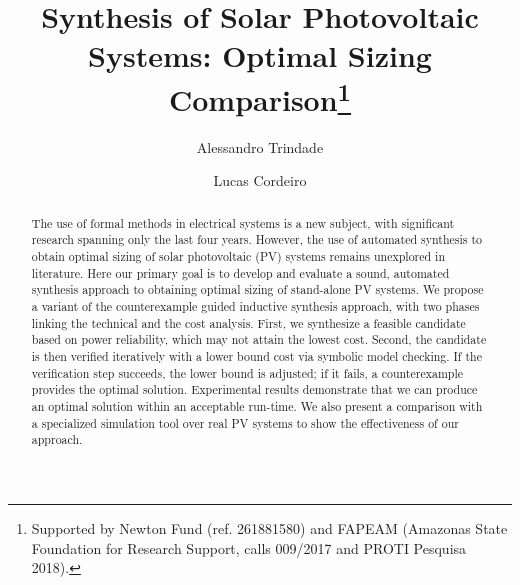 \documentclass[runningheads]{llncs}
\begin{document}
%
\title{Synthesis of Solar Photovoltaic Systems: Optimal Sizing Comparison\thanks{Supported by Newton Fund (ref. 261881580) and FAPEAM (Amazonas State Foundation for Research Support, calls 009/2017 and PROTI Pesquisa 2018).}}
%
%
\author{Alessandro Trindade \and Lucas Cordeiro} %
%
%
\maketitle              %

\begin{abstract}
The use of formal methods in electrical systems is a new subject, with significant research spanning only the last four years. However, the use of automated synthesis to obtain optimal sizing of solar photovoltaic (PV) systems remains unexplored in literature. Here our primary goal is to develop and evaluate a sound, automated synthesis approach to obtaining optimal sizing of stand-alone PV systems. We propose a variant of the counterexample guided inductive synthesis approach, with two phases linking the technical and the cost analysis. First, we synthesize a feasible candidate based on power reliability, which may not attain the lowest cost. Second, the candidate is then verified iteratively with a lower bound cost via symbolic model checking. If the verification step succeeds, the lower bound is adjusted; if it fails, a counterexample provides the optimal solution. Experimental results demonstrate that we can produce an optimal solution within an acceptable run-time. We also present a comparison with a specialized simulation tool over real PV systems to show the effectiveness of our approach.
\end{abstract}
\end{document}
